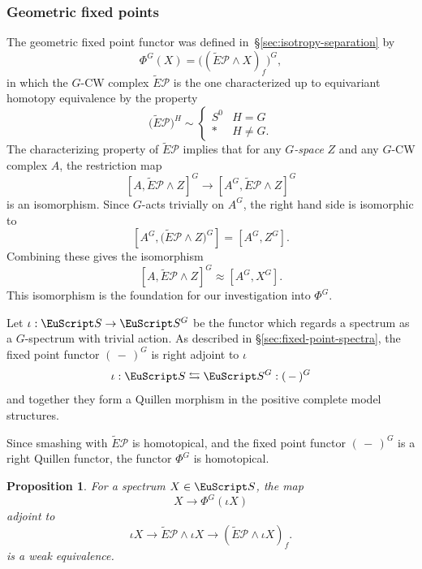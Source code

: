 \documentclass{amsart}
\newtheorem{prop}[equation]{Proposition}
\theoremstyle{definition}
\theoremstyle{remark}
\newcommand{\slot}{\,-\,}
\newcommand{\spectra}{\EuScript S}
\newcommand{\gfp}[1]{\Phi^{#1}}
\newcommand{\phig}{\gfp{G}}
\newcommand{\ugspectra}[1]{\spectra^{#1}}
\newcommand{\pfamily}{\mathcal P}
\begin{document}
\subsubsection{Geometric fixed points}
\label{sec:geom-fixed-points-2}

The geometric fixed point functor was defined in~\S\ref{sec:isotropy-separation} by
\[
\phig(X) = \big((\tilde E\pfamily\wedge X)_{f}\big)^{G},
\]
in which the $G$-CW complex $\tilde E\pfamily$ is the one characterized up to
equivariant homotopy equivalence by the property
\[
\big(\tilde E\pfamily\big)^{H} \sim 
\begin{cases}
S^{0}& H=G \\
\ast & H\ne G.
\end{cases}
\]
The characterizing property of $\tilde E\pfamily$ implies that for any
{\em $G$-space} $Z$ and any $G$-CW complex $A$, the restriction map
\[
[A,\tilde E\pfamily \wedge Z]^{G} \to 
[A^{G},\tilde E\pfamily \wedge Z]^{G}
\]
is an isomorphism.   Since $G$-acts trivially on $A^{G}$, the right
hand side is isomorphic to 
\[
[A^{G},\big(\tilde E\pfamily \wedge Z\big)^{G}] = 
[A^{G},Z^{G}].
\]
Combining these gives the isomorphism 
\begin{equation}
\label{eq:7}
[A,\tilde E\pfamily \wedge Z]^{G} \approx
[A^{G},X^{G}].
\end{equation}
This isomorphism is the foundation for our investigation into $\phig$.


Let $\iota:\spectra\to\ugspectra{G}$
be the functor which regards a spectrum as a $G$-spectrum with
trivial action.  As described in \S\ref{sec:fixed-point-spectra}, the
fixed point functor $(\slot)^{G}$ is right adjoint to $\iota$
\[
\iota:\spectra \leftrightarrows \ugspectra{G}: (\slot)^{G}
\]
and together they form a Quillen morphism in the positive complete
model structures.

Since smashing with $\tilde E\pfamily$ is homotopical, and the fixed
point functor $(\slot)^{G}$ is a right Quillen functor, the functor
$\phig$ is homotopical.   

\begin{prop}
\label{thm:246} 
For a spectrum $X\in \spectra$, the map
\begin{equation}
\label{eq:128}
X\to \phig(\iota X)
\end{equation}
adjoint to
\[
\iota X\to \tilde E\pfamily \wedge \iota X \to(\tilde E\pfamily \wedge \iota X)_{f}.
\]
is a weak equivalence.
\end{prop}
\end{document}
